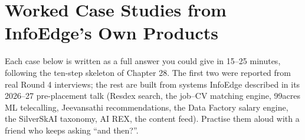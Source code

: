 \chapter{Worked Case Studies from InfoEdge's Own Products}

Each case below is written as a full answer you could give in 15--25 minutes, following the ten-step skeleton of Chapter 28. The first two were
reported from real Round 4 interviews; the rest are built from systems InfoEdge described in its 2026--27 pre-placement talk (Resdex search, the
job--CV matching engine, 99acres ML telecalling, Jeevansathi recommendations, the Data Factory salary engine, the SilverSkAI taxonomy, AI REX, the
content feed). Practise them aloud with a friend who keeps asking ``and then?''.

